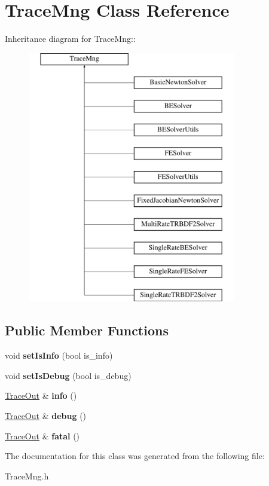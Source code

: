 \hypertarget{classTraceMng}{
\section{TraceMng Class Reference}
\label{classTraceMng}
}
Inheritance diagram for TraceMng::\begin{figure}[H]
\begin{center}
\leavevmode
\includegraphics[height=11cm]{classTraceMng}
\end{center}
\end{figure}
\subsection*{Public Member Functions}
\begin{DoxyCompactItemize}
\item 
\hypertarget{classTraceMng_a97874ba8114182fe38e7bbe4a7c8d847}{
void {\bfseries setIsInfo} (bool is\_\-info)}
\label{classTraceMng_a97874ba8114182fe38e7bbe4a7c8d847}

\item 
\hypertarget{classTraceMng_abc1600f6aa416e4e0fc0a9bb8c5fb83d}{
void {\bfseries setIsDebug} (bool is\_\-debug)}
\label{classTraceMng_abc1600f6aa416e4e0fc0a9bb8c5fb83d}

\item 
\hypertarget{classTraceMng_a1bd397263da82f212a67033973bdbde2}{
\hyperlink{classTraceOut}{TraceOut} \& {\bfseries info} ()}
\label{classTraceMng_a1bd397263da82f212a67033973bdbde2}

\item 
\hypertarget{classTraceMng_ac0567336aae4223773ebe5328c916705}{
\hyperlink{classTraceOut}{TraceOut} \& {\bfseries debug} ()}
\label{classTraceMng_ac0567336aae4223773ebe5328c916705}

\item 
\hypertarget{classTraceMng_ad740a852e77265588f6c24733fcb6ca4}{
\hyperlink{classTraceOut}{TraceOut} \& {\bfseries fatal} ()}
\label{classTraceMng_ad740a852e77265588f6c24733fcb6ca4}

\end{DoxyCompactItemize}


The documentation for this class was generated from the following file:\begin{DoxyCompactItemize}
\item 
TraceMng.h\end{DoxyCompactItemize}
